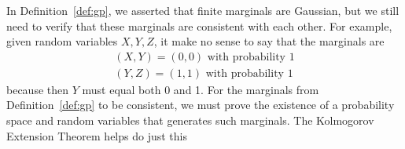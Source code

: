 In Definition~\ref{def:gp}, we asserted that finite marginals are Gaussian, but we still need to verify that these marginals are consistent with each other.
For example, given random variables $X, Y, Z$, it make no sense to say that the marginals are
\begin{align*}
    (X, Y) = (0, 0) \text{ with probability 1} \\
    (Y, Z) = (1, 1) \text{ with probability 1}
\end{align*}
because then $Y$ must equal both 0 and 1.
For the marginals from Definition~\ref{def:gp} to be consistent, 
we must prove the existence of a probability space and random variables that generates such marginals.
The Kolmogorov Extension Theorem helps do just this

